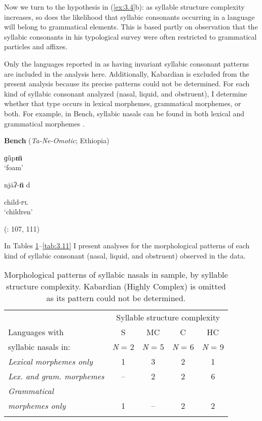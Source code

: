   Now we turn to the hypothesis in (\ref{ex:3.4}b): as syllable structure complexity increases, so does the likelihood that syllabic consonants occurring in a language will belong to grammatical elements. This is based partly on  observation that the syllabic consonants in his typological survey were often restricted to grammatical particles and affixes.

  Only the languages reported in  as having invariant syllabic consonant patterns are included in the analysis here. Additionally, Kabardian is excluded from the present analysis because its precise patterns could not be determined. For each kind of syllabic consonant analyzed (nasal, liquid, and obstruent), I determine whether that type occurs in lexical morphemes, grammatical morphemes, or both. For example, in Bench, syllabic nasals can be found in both lexical and grammatical morphemes .

\ea\label{ex:3.25}
  \textbf{Bench} (\textit{Ta-Ne-Omotic}; Ethiopia)

\ea   ɡȕp\textbf{m\={} }\\
\glt ‘foam’

\ex   njāʔ-\textbf{n\={} }d

child-\textsc{pl}\\
\glt ‘children’

(\citealt{Rapold2006}: 107, 111)
\z
\z

  In Tables \ref{tab:3.9}--\ref{tab:3.11} I present analyses for the morphological patterns of each kind of syllabic consonant (nasal, liquid, and obstruent) observed in the data.

\begin{table}
\begin{tabular}{lcccc}
\lsptoprule
 & \multicolumn{4}{c}{Syllable structure complexity}\\\cmidrule(lr){2-5}
Languages with & S & MC & C & HC\\
syllabic nasals in: & \textit{N} = 2 & \textit{N} = 5 & \textit{N} = 6 & \textit{N} = 9\\\midrule
 \textit{Lexical morphemes only} & 1 & 3 & 2 & 1\\
 \textit{Lex. and gram. morphemes} & -- & 2 & 2 & 6\\
 \textit{Grammatical} \\
\textit{morphemes only} & 1 & -- & 2 & 2\\
\lspbottomrule
\end{tabular}
\caption{\label{tab:3.9}Morphological patterns of syllabic nasals in sample, by syllable structure complexity. Kabardian (Highly Complex) is omitted as its pattern could not be determined.}
\end{table}




